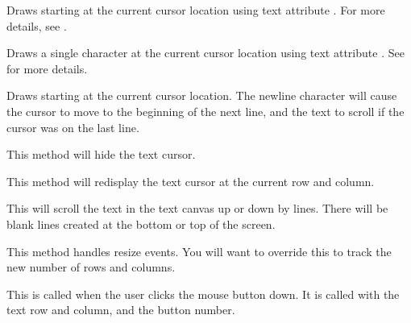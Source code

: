 Draws  starting at the current cursor location using
text attribute . For more details, see .


Draws a single character  at the current
cursor location using text attribute . See
 for more details.


Draws  starting at the current cursor location.
The newline character  will
cause the cursor to move to the beginning of the next line,
and the text to scroll if the cursor was on the last line.


This method will hide the text cursor.


This method will redisplay the text cursor at the current
row and column.


This will scroll the text in the text canvas up or down by
 lines.  There will be  blank lines
created at the bottom or top of the screen.


This method handles resize events. You will want to override
this to track the new number of rows and columns.


This is called when the user clicks the mouse button down.
It is called with the text row and column, and the button number.


